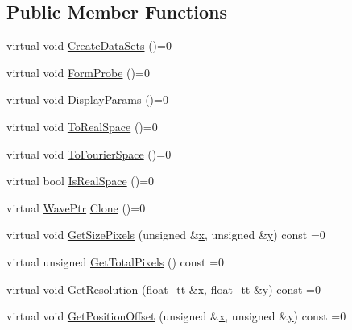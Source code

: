 \subsection*{Public Member Functions}
\begin{DoxyCompactItemize}
\item 
virtual void \hyperlink{class_q_s_t_e_m_1_1_i_wave_afe61d2338e172c828ad426bdcfe5c586}{Create\-Data\-Sets} ()=0
\item 
virtual void \hyperlink{class_q_s_t_e_m_1_1_i_wave_a55c2c7374f7a4f7b3540ab26499e2c09}{Form\-Probe} ()=0
\item 
virtual void \hyperlink{class_q_s_t_e_m_1_1_i_wave_adcd431f7e3e83aff6364e01e47a6eafb}{Display\-Params} ()=0
\item 
virtual void \hyperlink{class_q_s_t_e_m_1_1_i_wave_a0a4f027d331ec4cdc3197bdcb001b5f8}{To\-Real\-Space} ()=0
\item 
virtual void \hyperlink{class_q_s_t_e_m_1_1_i_wave_a66c1eb2a6f4818b84140fcce9cb08146}{To\-Fourier\-Space} ()=0
\item 
virtual bool \hyperlink{class_q_s_t_e_m_1_1_i_wave_a0b0859a45aaa48957353d7700c0a28b2}{Is\-Real\-Space} ()=0
\item 
virtual \hyperlink{namespace_q_s_t_e_m_ab42c5fe058973736465964e84b504b74}{Wave\-Ptr} \hyperlink{class_q_s_t_e_m_1_1_i_wave_ac4c887e52ac196c4dd9dd8dce347ef00}{Clone} ()=0
\item 
virtual void \hyperlink{class_q_s_t_e_m_1_1_i_wave_a6cb8d6a2bb671de1c8a1cd09575b3095}{Get\-Size\-Pixels} (unsigned \&\hyperlink{_read_d_m3___matlab_8m_a9336ebf25087d91c818ee6e9ec29f8c1}{x}, unsigned \&\hyperlink{qmb_8m_a2fb1c5cf58867b5bbc9a1b145a86f3a0}{y}) const =0
\item 
virtual unsigned \hyperlink{class_q_s_t_e_m_1_1_i_wave_a88a03dc0dead7142c0dc20e4aa62308f}{Get\-Total\-Pixels} () const =0
\item 
virtual void \hyperlink{class_q_s_t_e_m_1_1_i_wave_aabe5c51dac829a2e74d24242aa1c2831}{Get\-Resolution} (\hyperlink{namespace_q_s_t_e_m_a915d7caa497280d9f927c4ce8d330e47}{float\-\_\-tt} \&\hyperlink{_read_d_m3___matlab_8m_a9336ebf25087d91c818ee6e9ec29f8c1}{x}, \hyperlink{namespace_q_s_t_e_m_a915d7caa497280d9f927c4ce8d330e47}{float\-\_\-tt} \&\hyperlink{qmb_8m_a2fb1c5cf58867b5bbc9a1b145a86f3a0}{y}) const =0
\item 
virtual void \hyperlink{class_q_s_t_e_m_1_1_i_wave_aac77fc807a89d28d930933434df67f03}{Get\-Position\-Offset} (unsigned \&\hyperlink{_read_d_m3___matlab_8m_a9336ebf25087d91c818ee6e9ec29f8c1}{x}, unsigned \&\hyperlink{qmb_8m_a2fb1c5cf58867b5bbc9a1b145a86f3a0}{y}) const =0

\end{DoxyCompactItemize}
